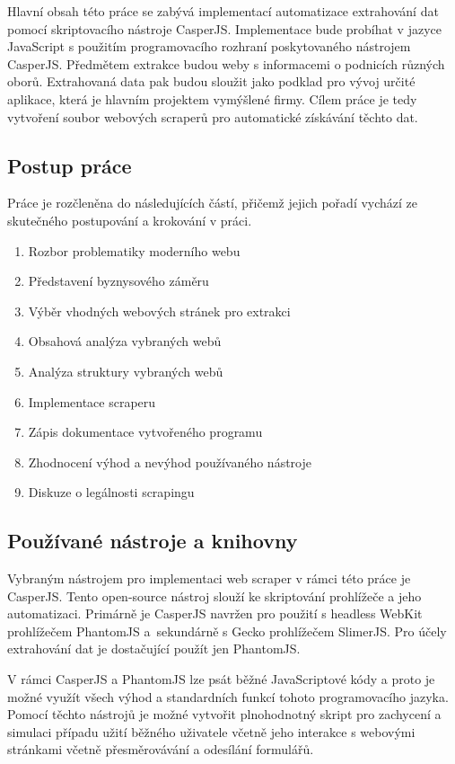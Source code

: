 \documentclass[11pt,a4paper]{article}
\begin{document}
Hlavní obsah této práce se zabývá implementací automatizace extrahování dat pomocí skriptovacího nástroje CasperJS\cite{casperjs}. Implementace bude probíhat v jazyce JavaScript s použitím programovacího rozhraní poskytovaného nástrojem CasperJS. Předmětem extrakce budou weby s informacemi o podnicích různých oborů. Extrahovaná data pak budou sloužit jako podklad pro vývoj určité aplikace, která je hlavním projektem vymýšlené firmy. Cílem práce je tedy vytvoření soubor webových scraperů pro automatické získávání těchto dat.

\subsection{Postup práce}
Práce je rozčleněna do následujících částí, přičemž jejich pořadí vychází ze skutečného postupování a krokování v práci.
\begin{enumerate}
\item Rozbor problematiky moderního webu
\item Představení byznysového záměru
\item Výběr vhodných webových stránek pro extrakci
\item Obsahová analýza vybraných webů
\item Analýza struktury vybraných webů
\item Implementace scraperu
\item Zápis dokumentace vytvořeného programu
\item Zhodnocení výhod a nevýhod používaného nástroje
\item Diskuze o legálnosti scrapingu
\end{enumerate}

\subsection{Používané nástroje a knihovny}
Vybraným nástrojem pro implementaci web scraper v rámci této práce je CasperJS. Tento open-source nástroj slouží ke skriptování prohlížeče a jeho automatizaci. Primárně je CasperJS navržen pro použití s headless WebKit prohlížečem PhantomJS a~sekundárně s Gecko prohlížečem SlimerJS. Pro účely extrahování dat je dostačující použít jen PhantomJS. 

V rámci CasperJS a PhantomJS lze psát běžné JavaScriptové kódy a proto je možné využít všech výhod a standardních funkcí tohoto programovacího jazyka. Pomocí těchto nástrojů je možné vytvořit plnohodnotný skript pro zachycení a simulaci případu užití běžného uživatele včetně jeho interakce s webovými stránkami včetně přesměrovávání a odesílání formulářů.
\end{document}
